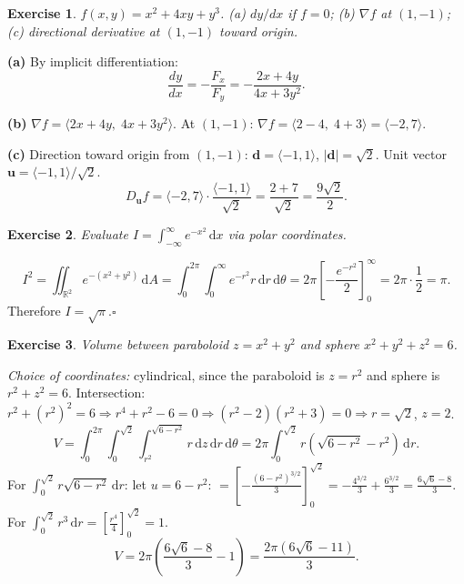 \documentclass[12pt,a4paper]{article}
\theoremstyle{exstyle}
\newtheorem{exercise}{Exercise}[section]
\newcommand{\R}{\mathbb{R}}
\newcommand{\grad}{\nabla}
\newcommand{\dif}[1]{\,\mathrm{d}#1}
\begin{document}
\begin{exercise}
$f(x,y)=x^2+4xy+y^3$. (a) $dy/dx$ if $f=0$; (b) $\grad f$ at $(1,-1)$;
(c) directional derivative at $(1,-1)$ toward origin.
\end{exercise}
\begin{solbox}
\textbf{(a)} By implicit differentiation:
\[
  \frac{dy}{dx}=-\frac{F_x}{F_y}=-\frac{2x+4y}{4x+3y^2}.
\]

\textbf{(b)} $\grad f=\langle 2x+4y,\;4x+3y^2\rangle$.
At $(1,-1)$: $\grad f=\langle2-4,\;4+3\rangle=\langle-2,7\rangle$.

\textbf{(c)} Direction toward origin from $(1,-1)$: $\mathbf{d}=\langle-1,1\rangle$, $|\mathbf{d}|=\sqrt{2}$.
Unit vector $\mathbf{u}=\langle-1,1\rangle/\sqrt{2}$.
\[
  D_{\mathbf{u}}f=\langle-2,7\rangle\cdot\frac{\langle-1,1\rangle}{\sqrt{2}}
  =\frac{2+7}{\sqrt{2}}=\frac{9\sqrt{2}}{2}.
\]
\end{solbox}

\begin{exercise}
Evaluate $I=\int_{-\infty}^{\infty}e^{-x^2}\dif{x}$ via polar coordinates.
\end{exercise}
\begin{solbox}
\[
  I^2=\iint_{\R^2}e^{-(x^2+y^2)}\dif{A}
  =\int_0^{2\pi}\!\int_0^\infty e^{-r^2}r\dif{r}\dif{\theta}
  =2\pi\left[-\frac{e^{-r^2}}{2}\right]_0^\infty=2\pi\cdot\frac{1}{2}=\pi.
\]
Therefore $I=\sqrt{\pi}$.\hfill$\square$
\end{solbox}

\begin{exercise}
Volume between paraboloid $z=x^2+y^2$ and sphere $x^2+y^2+z^2=6$.
\end{exercise}
\begin{solbox}
\emph{Choice of coordinates:} cylindrical, since the paraboloid is $z=r^2$ and sphere is $r^2+z^2=6$.
Intersection: $r^2+(r^2)^2=6\Rightarrow r^4+r^2-6=0\Rightarrow(r^2-2)(r^2+3)=0\Rightarrow r=\sqrt{2}$, $z=2$.
\[
  V=\int_0^{2\pi}\!\int_0^{\sqrt{2}}\!\int_{r^2}^{\sqrt{6-r^2}}r\dif{z}\dif{r}\dif{\theta}
  =2\pi\int_0^{\sqrt{2}}r\!\left(\sqrt{6-r^2}-r^2\right)\dif{r}.
\]
For $\int_0^{\sqrt{2}}r\sqrt{6-r^2}\dif{r}$: let $u=6-r^2$:
$=\left[-\tfrac{(6-r^2)^{3/2}}{3}\right]_0^{\sqrt{2}}=-\tfrac{4^{3/2}}{3}+\tfrac{6^{3/2}}{3}=\tfrac{6\sqrt{6}-8}{3}$.
For $\int_0^{\sqrt{2}}r^3\dif{r}=\left[\tfrac{r^4}{4}\right]_0^{\sqrt{2}}=1$.
\[
  V=2\pi\!\left(\frac{6\sqrt{6}-8}{3}-1\right)=\frac{2\pi(6\sqrt{6}-11)}{3}.
\]
\end{solbox}
\end{document}

